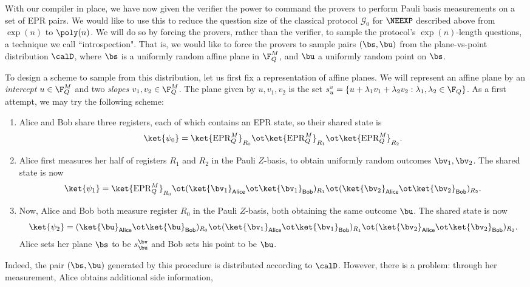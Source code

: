 \documentclass[11pt]{article}
\newcommand{\game}{\mathscr{G}}
\newcommand{\epr}{\mathrm{EPR}}
\newcommand{\reg}[1]{{\mathsf{#1}}}
\begin{document}
With our compiler in place, we have now given the verifier the power
to command the provers to perform Pauli basis measurements on a set of
EPR pairs.
We would like to use this to reduce the question size of the classical protocol $\game_0$ for $\NEEXP$ described above
from $\exp(n)$ to $\poly(n)$.
We will do so by forcing the provers, rather than the verifier, to sample the protocol's $\exp(n)$-length questions,
a technique we call ``introspection".
That is, we would like to force the provers to
sample pairs $(\bs, \bu)$ from the plane-vs-point distribution $\calD$, where $\bs$ is a uniformly random
affine plane in $\F_Q^M$, and $\bu$ a uniformly random point on
$\bs$.

To design a scheme to sample from this distribution, let us first fix
a representation of affine planes. We will represent an affine plane
by an \emph{intercept} $u \in \F_Q^M$ and two \emph{slopes} $v_1, v_2
\in \F_Q^M$. The plane given by $u, v_1, v_2$ is the set $s_u^v = \{ u +
\lambda_1 v_1 + \lambda_2 v_2 : \lambda_1, \lambda_2 \in \F_Q\}$. As a
first attempt, we may try the following scheme:
\begin{enumerate}
  \item Alice and Bob share three registers, each of which contains an
    EPR state, so their shared state is
    \[ \ket{\psi_0} = \ket{\epr_Q^M}_{R_0} \ot \ket{\epr_Q^M}_{R_1} \ot
      \ket{\epr_Q^M}_{R_2}. \]
  \item Alice first measures her half of registers $R_1$ and $R_2$ in
    the Pauli $Z$-basis, to obtain uniformly random outcomes $\bv_1,
    \bv_2$. The shared state is now
    \[ \ket{\psi_1} = \ket{\epr_Q^M}_{R_0} \ot
      (\ket{\bv_1}_{\reg{Alice}} \ot \ket{\bv_1}_{\reg{Bob}})_{R_1} \ot
      (\ket{\bv_2}_{\reg{Alice}} \ot \ket{\bv_2}_{\reg{Bob}})_{R_2}. \]
  \item Now, Alice and Bob both measure register $R_0$ in the Pauli
    $Z$-basis, both obtaining the same outcome $\bu$. The shared state
    is now
    \[ \ket{\psi_2} = (\ket{\bu}_{\reg{Alice}} \ot
      \ket{\bu}_{\reg{Bob}})_{R_0}    \ot  (\ket{\bv_1}_{\reg{Alice}} \ot \ket{\bv_1}_{\reg{Bob}})_{R_1} \ot
      (\ket{\bv_2}_{\reg{Alice}} \ot \ket{\bv_2}_{\reg{Bob}})_{R_2}. \]
    Alice sets her plane $\bs$ to be $s_{\bu}^{\bv}$ and Bob sets his point to be $\bu$.
  \end{enumerate}
  Indeed, the pair $(\bs, \bu)$ generated by this procedure is
  distributed according to $\calD$. However, there is a problem:
  through her measurement, Alice obtains additional side information,
\end{document}

